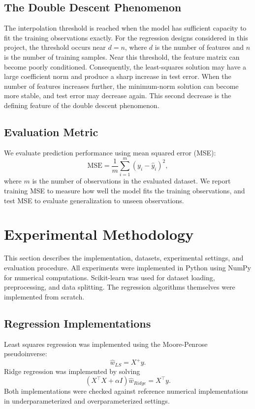 \documentclass[11pt,a4paper]{article}
\begin{document}
\subsection{The Double Descent Phenomenon}
The interpolation threshold is reached when the
model has sufficient capacity to fit the training
observations exactly.
For the regression designs considered in this project,
the threshold occurs near $d=n$, where $d$ is the
number of features and $n$ is the number of
training samples.
Near this threshold, the feature matrix can become
poorly conditioned. Consequently, the least-squares
solution may have a large coefficient norm and
produce a sharp increase in test error.
When the number of features increases further,
the minimum-norm solution can become more stable,
and test error may decrease again.
This second decrease is the defining feature of
the double descent phenomenon.

\subsection{Evaluation Metric}
We evaluate prediction performance using mean
squared error (MSE):
\begin{equation}
    \mathrm{MSE}
    =
    \frac{1}{m}
    \sum_{i=1}^{m}
    (y_i-\hat{y}_i)^2,
\end{equation}
where $m$ is the number of observations
in the evaluated dataset.
We report training MSE to measure how well
the model fits the training observations,
and test MSE to evaluate generalization
to unseen observations.

\section{Experimental Methodology}
This section describes the implementation, datasets,
experimental settings, and evaluation procedure.
All experiments were implemented in Python using NumPy
for numerical computations. Scikit-learn was used for
dataset loading, preprocessing, and data splitting.
The regression algorithms themselves were implemented
from scratch.

\subsection{Regression Implementations}
Least squares regression was implemented using the
Moore-Penrose pseudoinverse:
\begin{equation}
    \hat{w}_{LS} = X^{+}y.
\end{equation}
Ridge regression was implemented by solving
\begin{equation}
    (X^\top X+\alpha I)\hat{w}_{Ridge}=X^\top y.
\end{equation}
Both implementations were checked against reference
numerical implementations in underparameterized
and overparameterized settings.
\end{document}
